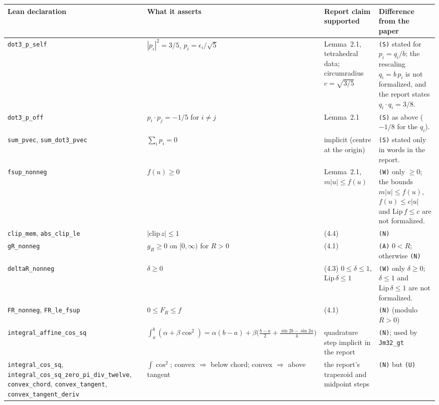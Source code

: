 \documentclass[11pt]{article}
\newcommand{\Ln}[1]{\texttt{#1}}
\newcommand{\No}{\texttt{(N)}}
\newcommand{\Sc}{\texttt{(S)}}
\newcommand{\Wk}{\texttt{(W)}}
\newcommand{\As}{\texttt{(A)}}
\newcommand{\Us}{\texttt{(U)}}
\begin{document}
{\footnotesize
\begin{longtable}{L{3.7cm}L{4.2cm}L{3.4cm}L{4.7cm}}
\toprule
Lean declaration & What it asserts & Report claim supported & Difference from the paper\\
\midrule\endhead
\Ln{dot3\_\allowbreak{}p\_\allowbreak{}self} & $|p_i|^2=3/5$, $p_i=\epsilon_i/\sqrt5$ & Lemma~2.1, tetrahedral data;
circumradius $c=\sqrt{3/5}$ & \Sc{} stated for $p_i=q_i/b$; the rescaling $q_i=b\,p_i$ is not
formalized, and the report states $q_i\cdot q_i=3/8$.\\
\Ln{dot3\_\allowbreak{}p\_\allowbreak{}off} & $p_i\cdot p_j=-1/5$ for $i\neq j$ & Lemma~2.1 & \Sc{} as above ($-1/8$ for
the $q_i$).\\
\Ln{sum\_\allowbreak{}pvec}, \Ln{sum\_\allowbreak{}dot3\_\allowbreak{}pvec} & $\sum_i p_i=0$ & implicit (centre at the origin) & \Sc{}
stated only in words in the report.\\
\Ln{fsup\_\allowbreak{}nonneg} & $f(u)\ge0$ & Lemma~2.1, $m|u|\le f(u)$ & \Wk{} only $\ge0$; the bounds
$m|u|\le f(u)$, $f(u)\le c|u|$ and $\mathrm{Lip}\,f\le c$ are not formalized.\\
\Ln{clip\_\allowbreak{}mem}, \Ln{abs\_\allowbreak{}clip\_\allowbreak{}le} & $|\mathrm{clip}\,z|\le1$ & (4.4) & \No\\
\Ln{gR\_\allowbreak{}nonneg} & $g_R\ge0$ on $[0,\infty)$ for $R>0$ & (4.1) & \As{} $0<R$; otherwise \No\\
\Ln{deltaR\_\allowbreak{}nonneg} & $\delta\ge0$ & (4.3) $0\le\delta\le1$, $\mathrm{Lip}\,\delta\le1$ &
\Wk{} only $\delta\ge0$; $\delta\le1$ and $\mathrm{Lip}\,\delta\le1$ are not formalized.\\
\Ln{FR\_\allowbreak{}nonneg}, \Ln{FR\_\allowbreak{}le\_\allowbreak{}fsup} & $0\le F_R\le f$ & (4.1) & \No{} (modulo $R>0$)\\
\Ln{integral\_\allowbreak{}affine\_\allowbreak{}cos\_\allowbreak{}sq} & $\int_a^b(\alpha+\beta\cos^2)=\alpha(b-a)+\beta\bigl(\frac{b-a}2+
\frac{\sin2b-\sin2a}4\bigr)$ & quadrature step implicit in the report & \No{}; used by
\Ln{Jm32\_\allowbreak{}gt}\\
\Ln{integral\_\allowbreak{}cos\_\allowbreak{}sq}, \Ln{integral\_\allowbreak{}cos\_\allowbreak{}sq\_\allowbreak{}zero\_\allowbreak{}pi\_\allowbreak{}div\_\allowbreak{}twelve}, \Ln{convex\_\allowbreak{}chord},
\Ln{convex\_\allowbreak{}tangent}, \Ln{convex\_\allowbreak{}tangent\_\allowbreak{}deriv} & $\int\cos^2$; convex $\Rightarrow$ below chord;
convex $\Rightarrow$ above tangent & the report's trapezoid and midpoint steps & \No{} but \Us{}

\end{longtable}}
\end{document}
